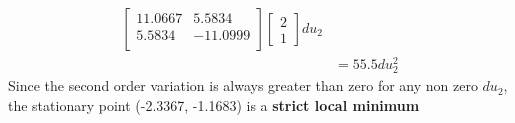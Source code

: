 \begin{enumerate}
\begin{enumerate}
\begin{align*}
	                                       \begin{bmatrix}
	                                       11.0667 & 5.5834\\
	                                       5.5834 & -11.0999\\
	                                       \end{bmatrix}
	                                       \begin{bmatrix}
	                                        2\\ 1
	                                       \end{bmatrix} du_2 \\
	                    &= 55.5 du_2^2
    \end{align*}
  Since the second order variation is always greater than zero for any non zero $du_2$, the stationary point (-2.3367, -1.1683) is a \textbf{strict local minimum}
  \end{enumerate}
  

\end{enumerate}
